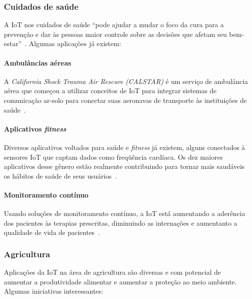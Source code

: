 \documentclass[pdftex, brazil, 12pt, twoside]{article}
\newcommand{\ingles}[1]{\textit{#1}}
\begin{document}
\subsubsection{Cuidados de saúde}
\label{aplicacoes-iot-exemplos-saude}

A IoT nos cuidados de saúde ``pode ajudar
a mudar o foco da cura para a prevenção e dar às pessoas maior controle sobre
as decisões que afetam seu bem-estar''~\citep[][p.\ 29]{UKGOSWalportIoT2014}.
Algumas aplicações já existem:

\paragraph{Ambulâncias aéreas} A \ingles{California Shock Trauma Air Rescure (CALSTAR)}
é um serviço de ambulância aérea que começou a utilizar conceitos de IoT para
integrar sistemas de comunicação ar-solo para conectar suas aeronavas de
transporte às instituições de saúde~\citep{CiscoCALSTAR}.

\paragraph{Aplicativos \emph{fitness}} Diversos aplicativos voltados para saúde
e \emph{fitness} já existem, alguns conectados à sensores IoT que captam
dados como freqüência cardíaca. Os dez maiores aplicativos desse gênero
estão realmente contribuindo para tornar mais saudáveis os hábitos
de saúde de seus usuários~\citep{OliverWymanIoT2015}.

\paragraph{Monitoramento contínuo} Usando soluções de monitoramento contínuo,
a IoT está aumentando a aderência dos pacientes às terapias prescritas, diminuindo
as internações e aumentanto a qualidade de vida de pacientes~\citep{McKinseyIoTHype}.


\subsubsection{Agricultura}
\label{aplicacoes-iot-exemplos-agricultura}

Aplicações da IoT na área de agricultura são diversas e com potencial de aumentar
a produtividade alimentar e aumentar a proteção ao meio ambiente. Algumas
iniciativas interessantes:
\end{document}

